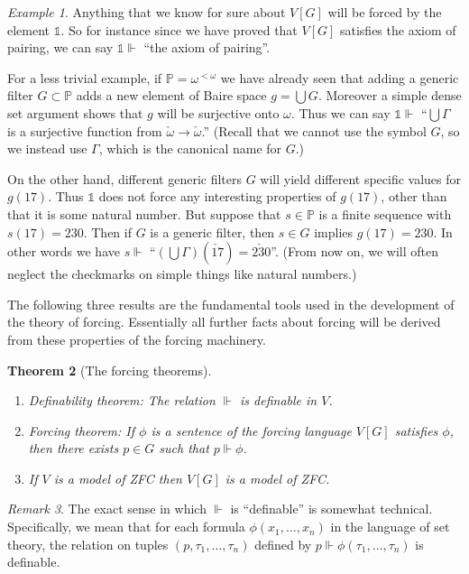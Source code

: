 \documentclass[11pt,oneside]{amsbook}
\newcommand{\forces}{\Vdash}
\theoremstyle{definition}
\theoremstyle{plain}
\newtheorem{theorem}{Theorem}[section]
\theoremstyle{definition}
\theoremstyle{remark}
\newtheorem{remark}[theorem]{Remark}
\newtheorem{example}[theorem]{Example}
\numberwithin{equation}{section}
\numberwithin{figure}{section}
\begin{document}
\begin{example}
  Anything that we know for sure about $V[G]$ will be forced by the element $\mathbb 1$. So for instance since we have proved that $V[G]$ satisfies the axiom of pairing, we can say $\mathbb 1\forces$ ``the axiom of pairing''.

  For a less trivial example, if $\mathbb P=\omega^{<\omega}$ we have already seen that adding a generic filter $G\subset\mathbb P$ adds a new element of Baire space $g=\bigcup G$. Moreover a simple dense set argument shows that $g$ will be surjective onto $\omega$. Thus we can say $\mathbb 1\forces$ ``$\bigcup\Gamma$ is a surjective function from $\check\omega\to\check\omega$.'' (Recall that we cannot use the symbol $G$, so we instead use $\Gamma$, which is the canonical name for $G$.)

  On the other hand, different generic filters $G$ will yield different specific values for $g(17)$. Thus $\mathbb 1$ does not force any interesting properties of $g(17)$, other than that it is some natural number. But suppose that $s\in\mathbb P$ is a finite sequence with $s(17)=230$. Then if $G$ is a generic filter, then $s\in G$ implies $g(17)=230$. In other words we have $s\forces$ ``$(\bigcup\Gamma)(\check{17})=\check{230}$''. (From now on, we will often neglect the checkmarks on simple things like natural numbers.)
\end{example}

The following three results are the fundamental tools used in the development of the theory of forcing. Essentially all further facts about forcing will be derived from these properties of the forcing machinery.

\begin{theorem}[The forcing theorems]\
\label{thm:forcing}
\begin{enumerate}
\item \textup{Definability theorem}: The relation $\forces$ is definable in $V$.
\item \textup{Forcing theorem}: If $\phi$ is a sentence of the forcing language $V[G]$ satisfies $\phi$, then there exists $p\in G$ such that $p\forces\phi$.
\item If $V$ is a model of ZFC then $V[G]$ is a model of ZFC.
\end{enumerate}
\end{theorem}

\begin{remark}
  The exact sense in which $\forces$ is ``definable'' is somewhat technical. Specifically, we mean that for each formula $\phi(x_1,\ldots,x_n)$ in the language of set theory, the relation on tuples $(p,\tau_1,\ldots,\tau_n)$ defined by $p\forces\phi(\tau_1,\ldots,\tau_n)$ is definable.
\end{remark}
\end{document}
